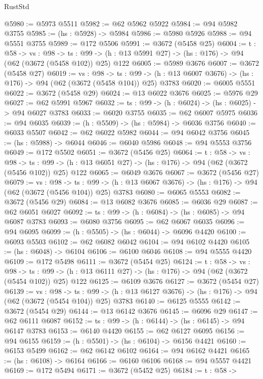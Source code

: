 \begin{lexlean}{RustStd}
\begin{coremodule}
{\begin{coremodule}
{{{{{{{{{{{@5980 := @5973 @5511
@5982 := @62 @5962 @5922
@5984 := @94 @5982 @3755
@5985 := (hs : @5928) -> @5984
@5986 := @5980 @5926
@5988 := @94 @5551 @3755
@5989 := @172 @5506
@5991 := @3672 (@5458 @25)
@6004 := {t : @58} ->
  {vs : @98} ->
  {ts : @99} -> (h : @13 @5991 @27) -> (hs : @176) -> @94 (@62 (@3672 (@5458 @102)) @25) @122
@6005 := @5989 @3676
@6007 := @3672 (@5458 @27)
@6019 := {vs : @98} ->
  {ts : @99} -> (h : @13 @6007 @3676) -> (hs : @176) -> @94 (@62 (@3672 (@5458 @104)) @25) @3783
@6020 := @6005 @5551
@6022 := @3672 (@5458 @29)
@6024 := @13 @6022 @3676
@6025 := @5976 @29
@6027 := @62 @5991 @5967
@6032 := {ts : @99} -> (h : @6024) -> (hs : @6025) -> @94 @6027 @3783
@6033 := @6020 @3755
@6035 := @62 @6007 @5975
@6036 := @94 @6035
@6039 := (h : @5509) -> (hs : @5984) -> @6036 @3756
@6040 := @6033 @5507
@6042 := @62 @6022 @5982
@6044 := @94 @6042 @3756
@6045 := (hs : @5988) -> @6044
@6046 := @6040 @5986
@6048 := @94 @5553 @3756
@6049 := @172 @5502
@6051 := @3672 (@5456 @25)
@6064 := {t : @58} ->
  {vs : @98} ->
  {ts : @99} -> (h : @13 @6051 @27) -> (hs : @176) -> @94 (@62 (@3672 (@5456 @102)) @25) @122
@6065 := @6049 @3676
@6067 := @3672 (@5456 @27)
@6079 := {vs : @98} ->
  {ts : @99} -> (h : @13 @6067 @3676) -> (hs : @176) -> @94 (@62 (@3672 (@5456 @104)) @25) @3783
@6080 := @6065 @5553
@6082 := @3672 (@5456 @29)
@6084 := @13 @6082 @3676
@6085 := @6036 @29
@6087 := @62 @6051 @6027
@6092 := {ts : @99} -> (h : @6084) -> (hs : @6085) -> @94 @6087 @3783
@6093 := @6080 @3756
@6095 := @62 @6067 @6035
@6096 := @94 @6095
@6099 := (h : @5505) -> (hs : @6044) -> @6096 @4420
@6100 := @6093 @5503
@6102 := @62 @6082 @6042
@6104 := @94 @6102 @4420
@6105 := (hs : @6048) -> @6104
@6106 := @6100 @6046
@6108 := @94 @5555 @4420
@6109 := @172 @5498
@6111 := @3672 (@5454 @25)
@6124 := {t : @58} ->
  {vs : @98} ->
  {ts : @99} -> (h : @13 @6111 @27) -> (hs : @176) -> @94 (@62 (@3672 (@5454 @102)) @25) @122
@6125 := @6109 @3676
@6127 := @3672 (@5454 @27)
@6139 := {vs : @98} ->
  {ts : @99} -> (h : @13 @6127 @3676) -> (hs : @176) -> @94 (@62 (@3672 (@5454 @104)) @25) @3783
@6140 := @6125 @5555
@6142 := @3672 (@5454 @29)
@6144 := @13 @6142 @3676
@6145 := @6096 @29
@6147 := @62 @6111 @6087
@6152 := {ts : @99} -> (h : @6144) -> (hs : @6145) -> @94 @6147 @3783
@6153 := @6140 @4420
@6155 := @62 @6127 @6095
@6156 := @94 @6155
@6159 := (h : @5501) -> (hs : @6104) -> @6156 @4421
@6160 := @6153 @5499
@6162 := @62 @6142 @6102
@6164 := @94 @6162 @4421
@6165 := (hs : @6108) -> @6164
@6166 := @6160 @6106
@6168 := @94 @5557 @4421
@6169 := @172 @5494
@6171 := @3672 (@5452 @25)
@6184 := {t : @58} ->
}}}}}}}}}}}
\end{coremodule}}
\end{coremodule}
\end{lexlean}
